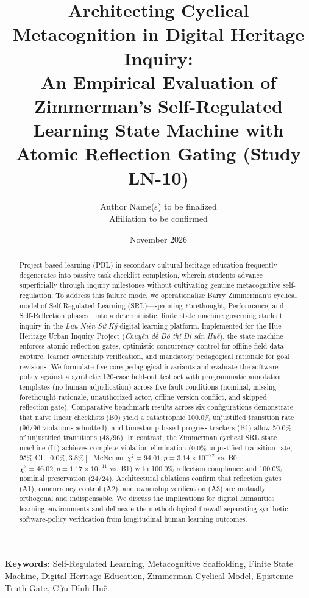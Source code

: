 \documentclass[11pt,a4paper]{article}
\title{\textbf{Architecting Cyclical Metacognition in Digital Heritage Inquiry:\\An Empirical Evaluation of Zimmerman's Self-Regulated Learning State Machine with Atomic Reflection Gating (Study LN-10)}}
\author{
    Author Name(s) to be finalized \\
    \small Affiliation to be confirmed
}
\date{November 2026}
\begin{document}
\maketitle

\begin{abstract}
Project-based learning (PBL) in secondary cultural heritage education frequently degenerates into passive task checklist completion, wherein students advance superficially through inquiry milestones without cultivating genuine metacognitive self-regulation. To address this failure mode, we operationalize Barry Zimmerman's cyclical model of Self-Regulated Learning (SRL)---spanning Forethought, Performance, and Self-Reflection phases---into a deterministic, finite state machine governing student inquiry in the \textit{Lưu Niên Sứ Ký} digital learning platform. Implemented for the Hue Heritage Urban Inquiry Project (\textit{Chuyên đề Đô thị Di sản Huế}), the state machine enforces atomic reflection gates, optimistic concurrency control for offline field data capture, learner ownership verification, and mandatory pedagogical rationale for goal revisions. We formulate five core pedagogical invariants and evaluate the software policy against a synthetic 120-case held-out test set with programmatic annotation templates (no human adjudication) across five fault conditions (nominal, missing forethought rationale, unauthorized actor, offline version conflict, and skipped reflection gate). Comparative benchmark results across six configurations demonstrate that naive linear checklists (B0) yield a catastrophic 100.0\% unjustified transition rate ($96/96$ violations admitted), and timestamp-based progress trackers (B1) allow 50.0\% of unjustified transitions ($48/96$). In contrast, the Zimmerman cyclical SRL state machine (I1) achieves complete violation elimination (0.0\% unjustified transition rate, 95\% CI $[0.0\%, 3.8\%]$, McNemar $\chi^2 = 94.01, p = 3.14 \times 10^{-22}$ vs. B0; $\chi^2 = 46.02, p = 1.17 \times 10^{-11}$ vs. B1) with 100.0\% reflection compliance and 100.0\% nominal preservation ($24/24$). Architectural ablations confirm that reflection gates (A1), concurrency control (A2), and ownership verification (A3) are mutually orthogonal and indispensable. We discuss the implications for digital humanities learning environments and delineate the methodological firewall separating synthetic software-policy verification from longitudinal human learning outcomes.
\end{abstract}

\noindent\textbf{Keywords:} Self-Regulated Learning, Metacognitive Scaffolding, Finite State Machine, Digital Heritage Education, Zimmerman Cyclical Model, Epistemic Truth Gate, Cửu Đỉnh Huế.
\end{document}

